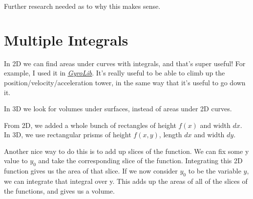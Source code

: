 \documentclass[12pt, letterpaper]{article}
\newcommand{\externalLink}[2]{\emph{\underline{\href{#1}{#2}}}}
\begin{document}
Further research needed as to why this makes sense.

\section{Multiple Integrals}
In 2D we can find areas under curves with integrals, and that's super useful!
For example, I used it in \externalLink{https://github.com/SAXTEN2011/GyroLib2020}{GyroLib}.
It's really useful to be able to climb up the position/velocity/acceleration tower, in the same way that it's useful to go down it.

In 3D we look for volumes under surfaces, instead of areas under 2D curves.

From 2D, we added a whole bunch of rectangles of height $f(x)$ and width $dx$. 
In 3D, we use rectangular prisms of height $f(x, y)$, length $dx$ and width $dy$.

Another nice way to do this is to add up slices of the function. 
We can fix some y value to $y_0$ and take the corresponding slice of the function.
Integrating this 2D function gives us the area of that slice.
If we now consider $y_0$ to be the variable $y$, we can integrate that integral over y.
This adds up the areas of all of the slices of the functions, and gives us a volume.
\end{document}
